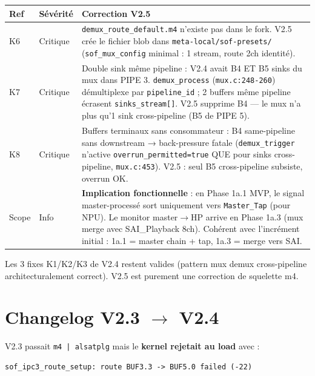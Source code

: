 \documentclass[11pt,a4paper]{article}
\begin{document}
\begin{center}
\begin{tabularx}{\textwidth}{llX}
\toprule
\textbf{Ref} & \textbf{Sévérité} & \textbf{Correction V2.5} \\
\midrule
K6 & Critique & \texttt{demux\_route\_default.m4} n'existe pas dans le fork. V2.5 crée le fichier blob dans \texttt{meta-local/sof-presets/} (\texttt{sof\_mux\_config} minimal : 1 stream, route 2ch identité). \\
K7 & Critique & Double sink même pipeline : V2.4 avait B4 ET B5 sinks du mux dans PIPE 3. \texttt{demux\_process} (\texttt{mux.c:248-260}) démultiplexe par \texttt{pipeline\_id} ; 2 buffers même pipeline écrasent \texttt{sinks\_stream[]}. V2.5 supprime B4 --- le mux n'a plus qu'1 sink cross-pipeline (B5 de PIPE 5). \\
K8 & Critique & Buffers terminaux sans consommateur : B4 same-pipeline sans downstream → back-pressure fatale (\texttt{demux\_trigger} n'active \texttt{overrun\_permitted=true} QUE pour sinks cross-pipeline, \texttt{mux.c:453}). V2.5 : seul B5 cross-pipeline subsiste, overrun OK. \\
Scope & Info & \textbf{Implication fonctionnelle} : en Phase 1a.1 MVP, le signal master-processé sort uniquement vers \texttt{Master\_Tap} (pour NPU). Le monitor master$\rightarrow$HP arrive en Phase 1a.3 (mux merge avec SAI\_Playback 8ch). Cohérent avec l'incrément initial : 1a.1 = master chain + tap, 1a.3 = merge vers SAI. \\
\bottomrule
\end{tabularx}
\end{center}

Les 3 fixes K1/K2/K3 de V2.4 restent valides (pattern mux demux cross-pipeline architecturalement correct). V2.5 est purement une correction de squelette m4.

\clearpage

\section*{Changelog V2.3 $\rightarrow$ V2.4}

V2.3 passait \texttt{m4 | alsatplg} mais le \textbf{kernel rejetait au load} avec :
\begin{verbatim}
sof_ipc3_route_setup: route BUF3.3 -> BUF5.0 failed (-22)
\end{verbatim}
\end{document}
